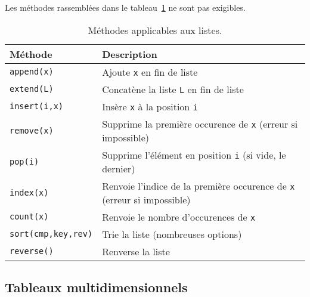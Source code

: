 %

Les méthodes rassemblées dans le tableau~\ref{tab.list.methodes} ne sont pas exigibles.
\begin{table}[!h]
\centering
    \begin{tabular}{lp{9cm}}
      \hline 
      \textbf{Méthode} & \textbf{Description} \\
      \hline
      \texttt{append(x)} & Ajoute \texttt{x} en fin de liste \\
      \texttt{extend(L)} & Concatène la liste \texttt{L} en fin de liste \\
      \texttt{insert(i,x)} & Insère  \texttt{x} à la position \texttt{i} \\
      \texttt{remove(x)} & Supprime la première occurence de \texttt{x} (erreur si impossible)\\
      \texttt{pop(i)} & Supprime l'élément en position \texttt{i} (si vide, le dernier) \\
      \texttt{index(x)} & Renvoie l'indice de la première occurence de \texttt{x} (erreur si impossible)\\
      \texttt{count(x)} & Renvoie le nombre d'occurences de \texttt{x} \\
      \texttt{sort(cmp,key,rev)} & Trie la liste (nombreuses options) \\
      \texttt{reverse()} & Renverse la liste \\
      \hline
    \end{tabular}
    \caption{Méthodes applicables aux listes.}
  \label{tab.list.methodes}
  \end{table}
  
\subsection{Tableaux multidimensionnels}

